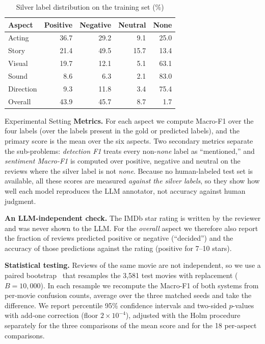 \documentclass[conference]{IEEEtran}
\makeatletter
\def\subsection{\@startsection{subsection}{2}{\z@}{1.6ex plus .8ex minus .4ex}{.7ex plus .2ex}%
  {\normalfont\fontsize{11}{13}\selectfont\bfseries\itshape\raggedright}}
\makeatother
\begin{document}
\begin{table}[t]
\caption{Silver label distribution on the training set (\%)}
\label{tab:dist}
\centering
\small
\begin{tabular*}{\columnwidth}{@{\extracolsep{\fill}}lrrrr@{}}
\toprule
Aspect & Positive & Negative & Neutral & None \\
\midrule
Acting & 36.7 & 29.2 & 9.1 & 25.0 \\
Story & 21.4 & 49.5 & 15.7 & 13.4 \\
Visual & 19.7 & 12.1 & 5.1 & 63.1 \\
Sound & 8.6 & 6.3 & 2.1 & 83.0 \\
Direction & 9.3 & 11.8 & 3.4 & 75.4 \\
Overall & 43.9 & 45.7 & 8.7 & 1.7 \\
\bottomrule
\end{tabular*}
\end{table}

\subsection{Experimental Setting}
\label{sec:protocol}
\textbf{Metrics.} For each aspect we compute Macro-F1 over the four labels (over the labels present in the gold or predicted labels), and the primary score is the mean over the six aspects. Two secondary metrics separate the sub-problems: \emph{detection F1} treats every non-\emph{none} label as ``mentioned,'' and \emph{sentiment Macro-F1} is computed over positive, negative and neutral on the reviews where the silver label is not \emph{none}. Because no human-labeled test set is available, all these scores are measured \emph{against the silver labels}, so they show how well each model reproduces the LLM annotator, not accuracy against human judgment.

\textbf{An LLM-independent check.} The IMDb star rating is written by the reviewer and was never shown to the LLM. For the \emph{overall} aspect we therefore also report the fraction of reviews predicted positive or negative (``decided'') and the accuracy of those predictions against the rating (positive for 7--10 stars).

\textbf{Statistical testing.} Reviews of the same movie are not independent, so we use a paired bootstrap~\cite{efron1993} that resamples the 3{,}581 test movies with replacement ($B=10{,}000$). In each resample we recompute the Macro-F1 of both systems from per-movie confusion counts, average over the three matched seeds and take the difference. We report percentile 95\% confidence intervals and two-sided $p$-values with add-one correction (floor $2\times10^{-4}$), adjusted with the Holm procedure~\cite{holm1979} separately for the three comparisons of the mean score and for the 18 per-aspect comparisons.
\end{document}
